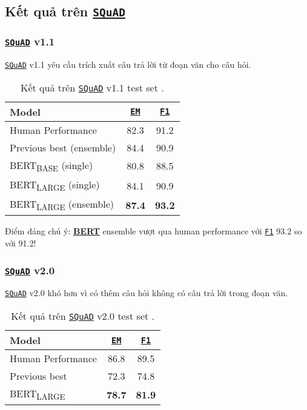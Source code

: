 \subsection{Kết quả trên \hyperref[acro:squad]{\texttt{SQuAD}}}
\label{ssec:ket_qua_squad}

\subsubsection{\hyperref[acro:squad]{\texttt{SQuAD}} v1.1}
\hyperref[acro:squad]{\texttt{SQuAD}} v1.1 yêu cầu trích xuất câu trả lời từ đoạn văn cho câu hỏi.

\begin{table}[H]
    \centering
    \caption{Kết quả trên \hyperref[acro:squad]{\texttt{SQuAD}} v1.1 test set \cite{devlin2018bert}.}
    \label{tab:squad_v1_results}
    \begin{tabular}{lcc}
        \toprule
        \textbf{Model} & \textbf{\hyperref[acro:em]{\texttt{EM}}} & \textbf{\hyperref[acro:f1]{\texttt{F1}}} \\
        \midrule
        Human Performance & 82.3 & 91.2 \\
        Previous best (ensemble) & 84.4 & 90.9 \\
        \midrule
        BERT\textsubscript{BASE} (single) & 80.8 & 88.5 \\
        BERT\textsubscript{LARGE} (single) & 84.1 & 90.9 \\
        BERT\textsubscript{LARGE} (ensemble) & \textbf{87.4} & \textbf{93.2} \\
        \bottomrule
    \end{tabular}
\end{table}

Điểm đáng chú ý: \hyperref[acro:bert]{\textbf{BERT}} ensemble vượt qua human performance với \hyperref[acro:f1]{\texttt{F1}} 93.2 so với 91.2!

\subsubsection{\hyperref[acro:squad]{\texttt{SQuAD}} v2.0}
\hyperref[acro:squad]{\texttt{SQuAD}} v2.0 khó hơn vì có thêm câu hỏi không có câu trả lời trong đoạn văn.

\begin{table}[H]
    \centering
    \caption{Kết quả trên \hyperref[acro:squad]{\texttt{SQuAD}} v2.0 test set \cite{devlin2018bert}.}
    \label{tab:squad_v2_results}
    \begin{tabular}{lcc}
        \toprule
        \textbf{Model} & \textbf{\hyperref[acro:em]{\texttt{EM}}} & \textbf{\hyperref[acro:f1]{\texttt{F1}}} \\
        \midrule
        Human Performance & 86.8 & 89.5 \\
        Previous best & 72.3 & 74.8 \\
        \midrule
        BERT\textsubscript{LARGE} & \textbf{78.7} & \textbf{81.9} \\
        \bottomrule
    \end{tabular}
\end{table}

